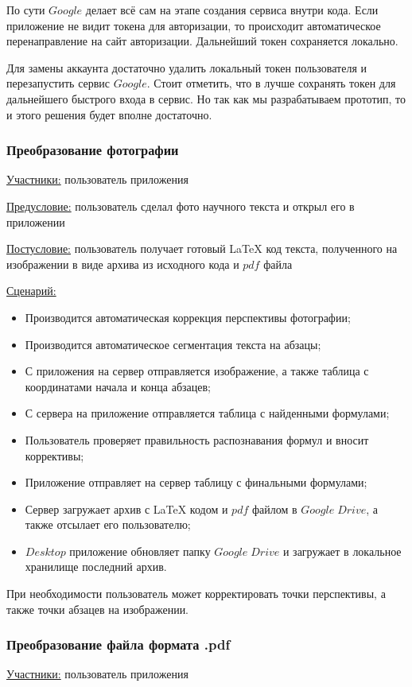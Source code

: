 По сути $Google$ делает всё сам на этапе создания сервиса внутри кода. Если приложение не видит токена для авторизации, то происходит автоматическое перенаправление на сайт авторизации. Дальнейший токен сохраняется локально.

Для замены аккаунта достаточно удалить локальный токен пользователя и перезапустить сервис $Google$. Стоит отметить, что в лучше сохранять токен для дальнейшего быстрого входа в сервис. Но так как мы разрабатываем прототип, то и этого решения будет вполне достаточно.

\subsubsection{Преобразование фотографии}
\underline{Участники:} пользователь приложения

\underline{Предусловие:} пользователь сделал фото научного текста и открыл его в приложении

\underline{Постусловие:} пользователь получает готовый \LaTeX\; код текста, полученного на изображении в виде архива из исходного кода и $pdf$ файла

\underline{Сценарий:}
\begin{itemize}
    \item Производится автоматическая коррекция перспективы фотографии;
    \item Производится автоматическое сегментация текста на абзацы;
    \item С приложения на сервер отправляется изображение, а также таблица с координатами начала и конца абзацев;
    \item С сервера на приложение отправляется таблица с найденными формулами;
    \item Пользователь проверяет правильность распознавания формул и вносит коррективы;
    \item Приложение отправляет на сервер таблицу с финальными формулами;
    \item Сервер загружает архив с \LaTeX\; кодом и $pdf$ файлом в $Google\;Drive$, а также отсылает его пользователю;
    \item $Desktop$ приложение обновляет папку $Google\;Drive$ и загружает в локальное хранилище последний архив.
\end{itemize}

При необходимости пользователь может корректировать точки перспективы, а также точки абзацев на изображении.

\subsubsection{Преобразование файла формата .pdf}
\underline{Участники:} пользователь приложения

